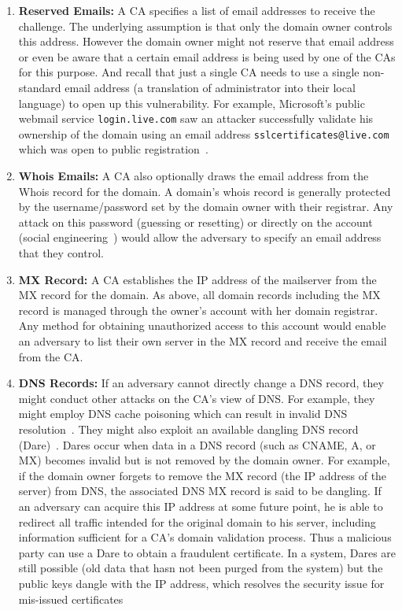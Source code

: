 \begin{enumerate}

\item \textbf{Reserved Emails:} A CA specifies a list of email addresses to receive the challenge. The underlying assumption is that only the domain owner controls this address. However the domain owner might not reserve that email address or even be aware that a certain email address is being used by one of the CAs for this purpose. And recall that just a single CA needs to use a single non-standard email address (\eg a translation of administrator into their local language) to open up this vulnerability. For example, Microsoft's public webmail service \texttt{login.live.com} saw an attacker successfully validate his ownership of the domain using an email address \texttt{sslcertificates@live.com} which was open to public registration~\cite{zusman2009criminal}.

\item \textbf{Whois Emails:} A CA also optionally draws the email address from the Whois record for the domain. A domain's whois record is generally protected by the username/password set by the domain owner with their registrar. Any attack on this password (\eg guessing or resetting) or directly on the account (\eg social engineering~\cite{GoDaddyo45:online}) would allow the adversary to specify an email address that they control. 

\item \textbf{MX Record:} A CA establishes the IP address of the mailserver from the MX record for the domain. As above, all domain records including the MX record is managed through the owner's account with her domain registrar. Any method for obtaining unauthorized access to this account would enable an adversary to list their own server in the MX record and receive the email from the CA.

\item \textbf{DNS Records:} If an adversary cannot directly change a DNS record, they might conduct other attacks on the CA's view of DNS. For example, they might employ DNS cache poisoning which can result in invalid DNS resolution~\cite{son2010hitchhiker}. They might also exploit an available dangling DNS record (Dare)~\cite{liu2016all}. Dares occur when data in a DNS record (such as CNAME, A, or MX) becomes invalid but is not removed by the domain owner. For example, if the domain owner forgets to remove the MX record (the IP address of the server) from DNS, the associated DNS MX record is said to be dangling. If an adversary can acquire this IP address at some future point, he is able to redirect all traffic intended for the original domain to his server, including information sufficient for a CA's domain validation process. Thus a malicious party can use a Dare to obtain a fraudulent certificate. In a \UA system, Dares are still possible (old data that hasn not been purged from the system) but the public keys dangle with the IP address, which resolves the security issue for mis-issued certificates


\end{enumerate}

